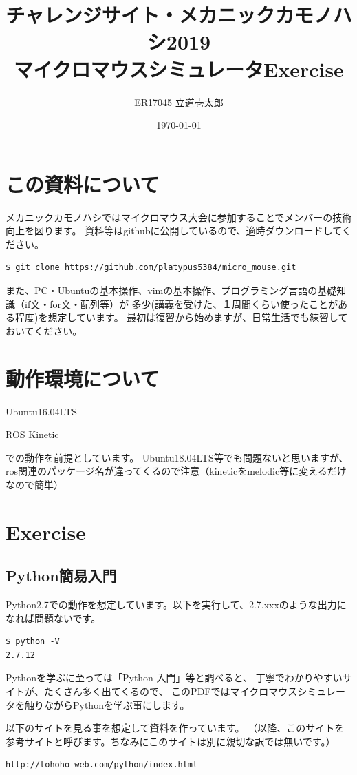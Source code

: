 \documentclass[11pt,a4paper]{jsarticle}
\title{チャレンジサイト・メカニックカモノハシ2019\\マイクロマウスシミュレータExercise}
\author{ER17045 立道壱太郎}
\date{\today}
\begin{document}
\maketitle
%
%
\section{この資料について}
メカニックカモノハシではマイクロマウス大会に参加することでメンバーの技術向上を図ります。
資料等はgithubに公開しているので、適時ダウンロードしてください。

\begin{lstlisting}[frame=single]
$ git clone https://github.com/platypus5384/micro_mouse.git
\end{lstlisting}

また、PC・Ubuntuの基本操作、vimの基本操作、プログラミング言語の基礎知識（if文・for文・配列等）が
多少(講義を受けた、１周間くらい使ったことがある程度)を想定しています。
最初は復習から始めますが、日常生活でも練習しておいてください。


\section{動作環境について}
Ubuntu16.04LTS

ROS Kinetic

での動作を前提としています。
Ubuntu18.04LTS等でも問題ないと思いますが、ros関連のパッケージ名が違ってくるので注意（kineticをmelodic等に変えるだけなので簡単）


\newpage




\section{Exercise}
\subsection{Python簡易入門}
Python2.7での動作を想定しています。以下を実行して、2.7.xxxのような出力になれば問題ないです。
\begin{lstlisting}[frame=single]
$ python -V
2.7.12
\end{lstlisting}

Pythonを学ぶに至っては「Python 入門」等と調べると、
丁寧でわかりやすいサイトが、たくさん多く出てくるので、
このPDFではマイクロマウスシミュレータを触りながらPythonを学ぶ事にします。

以下のサイトを見る事を想定して資料を作っています。
（以降、このサイトを参考サイトと呼びます。ちなみにこのサイトは別に親切な訳では無いです。）
\begin{lstlisting}[frame=single]
http://tohoho-web.com/python/index.html
\end{lstlisting}
\end{document}
